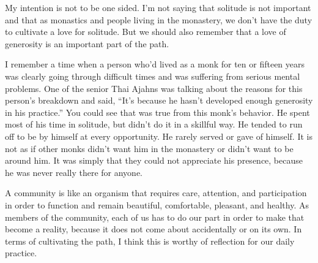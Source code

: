 My intention is not to be one sided. I'm not saying that solitude is 
not important and that as monastics and people living in the monastery, 
we don't have the duty to cultivate a love for solitude. But we should 
also remember that a love of generosity is an important part of the 
path.

I remember a time when a person who'd lived as a monk for ten or 
fifteen years was clearly going through difficult times and was 
suffering from serious mental problems. One of the senior Thai Ajahns 
was talking about the reasons for this person's breakdown and said, 
``It's because he hasn't developed enough generosity in his practice.'' 
You could see that was true from this monk's behavior. He spent most of 
his time in solitude, but didn't do it in a skillful way. He tended to 
run off to be by himself at every opportunity. He rarely served or gave 
of himself. It is not as if other monks didn't want him in the 
monastery or didn't want to be around him. It was simply that they 
could not appreciate his presence, because he was never really there 
for anyone.

A community is like an organism that requires care, attention, and 
participation in order to function and remain beautiful, comfortable, 
pleasant, and healthy. As members of the community, each of us has to 
do our part in order to make that become a reality, because it does not 
come about accidentally or on its own. In terms of cultivating the 
path, I think this is worthy of reflection for our daily practice.


